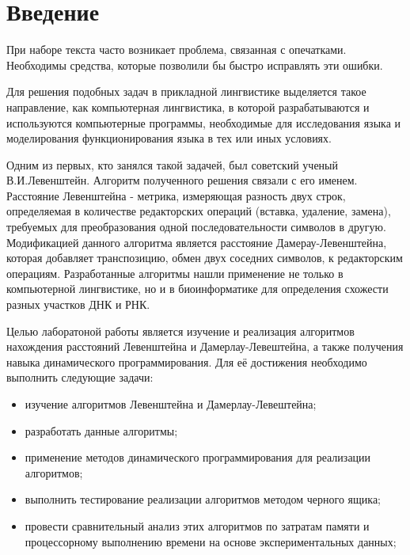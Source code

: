 \chapter*{Введение}
При наборе текста часто возникает проблема, связанная с опечатками. Необходимы средства, которые позволили бы быстро исправлять эти ошибки.

Для решения подобных задач в прикладной лингвистике выделяется такое направление, как компьютерная лингвистика, в которой разрабатываются и используются компьютерные программы, необходимые для исследования языка и моделирования функционирования языка в тех или иных условиях\cite{book1}.

Одним из первых, кто занялся такой задачей, был советский ученый В.И.Левенштейн\cite{Levenshtein}. Алгоритм полученного решения связали с его именем. Расстояние Левенштейна - метрика, измеряющая разность двух строк, определяемая в количестве редакторских операций (вставка, удаление, замена), требуемых для преобразования одной последовательности символов в другую. Модификацией данного алгоритма является расстояние Дамерау-Левенштейна, которая добавляет транспозицию, обмен двух соседних символов, к редакторским операциям. Разработанные алгоритмы нашли применение не только в компьютерной лингвистике, но и в биоинформатике для определения схожести разных участков ДНК и РНК.

Целью лаборатоной работы является изучение и реализация алгоритмов нахождения расстояний Левенштейна и Дамерлау-Левештейна, а также получения навыка динамического программирования. Для её достижения необходимо выполнить следующие задачи:
\begin{itemize}
	\item изучение алгоритмов Левенштейна и Дамерлау-Левештейна;
	\item разработать данные алгоритмы;
	\item применение методов динамического программирования для реализации алгоритмов;
	\item выполнить тестирование реализации алгоритмов методом черного ящика;
	\item провести сравнительный анализ этих алгоритмов по затратам памяти и процессорному выполнению времени на основе экспериментальных данных;
\end{itemize}